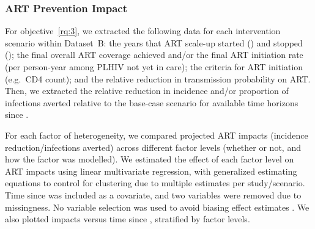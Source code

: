 \subsubsection{ART Prevention Impact}
\label{sss:meth:api}
For objective~\ref{rq:3}, we extracted
the following data for each intervention scenario within Dataset~B:
the years that ART scale-up started () and stopped ();
the final overall ART coverage achieved and/or
the final ART initiation rate (per person-year among PLHIV not yet in care);
the criteria for ART initiation (e.g.\ CD4 count); and
the relative reduction in transmission probability on ART.
Then, we extracted the
relative reduction in incidence and/or proportion of infections averted
relative to the base-case scenario for available time horizons since .
\par
For each factor of heterogeneity,
we compared projected ART impacts (incidence reduction/infections averted)
across different factor levels (whether or not, and how the factor was modelled).
We estimated the effect of each factor level on ART impacts
using linear multivariate regression, with generalized estimating equations \cite{Hojsgaard2006}
to control for clustering due to multiple estimates per study/scenario.
Time since  was included as a covariate, and two variables were removed due to missingness.
No variable selection was used to avoid biasing effect estimates \cite{Harrell2001}.
We also plotted impacts versus time since , stratified by factor levels.